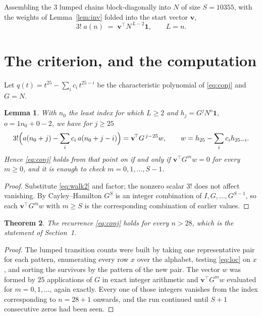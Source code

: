 \documentclass[11pt,a4paper]{article}
\theoremstyle{plain}
\newtheorem{theorem}{Theorem}
\newtheorem{lemma}[theorem]{Lemma}
\theoremstyle{definition}
\begin{document}
Assembling the $3$ lumped chains block-diagonally into $N$ of size $S=10355$, with the
weights of Lemma~\ref{lem:inv} folded into the start vector $\mathbf{v}$,
\begin{equation}\label{eq:walk2}
3!\;a(n)\;=\;\mathbf{v}^{\!\top}N^{\,L-2}\mathbf{1},\qquad L=n .
\end{equation}

\section{The criterion, and the computation}

Let $q(t)=t^{25}-\sum_i c_i\,t^{25-i}$ be the characteristic polynomial of
\eqref{eq:conj} and $G=N$.

\begin{lemma}\label{lem:crit}
With $n_0$ the least index for which $L\ge2$ and $h_j=G^{j}N^{o}\mathbf{1}$,
$o=1n_0+0-2$, we have for $j\ge25$
\[
3!\Bigl(a(n_0+j)-\sum_i c_i\,a(n_0+j-i)\Bigr)
=\mathbf{v}^{\!\top}G^{\,j-25}w,\qquad
w=h_{25}-\sum_i c_i h_{25-i} .
\]
Hence \eqref{eq:conj} holds from that point on if and only if
$\mathbf{v}^{\!\top}G^{m}w=0$ for every $m\ge0$, and it is enough to check
$m=0,1,\dots,S-1$.
\end{lemma}

\begin{proof}
Substitute \eqref{eq:walk2} and factor; the nonzero scalar $3!$ does not affect
vanishing. By Cayley--Hamilton $G^{S}$ is an integer combination of $I,G,\dots,G^{S-1}$,
so each $\mathbf{v}^{\!\top}G^{m}w$ with $m\ge S$ is the corresponding combination of
earlier values.
\end{proof}

\begin{theorem}
The recurrence \eqref{eq:conj} holds for every $n>28$, which is the statement of
Section~1.
\end{theorem}

\begin{proof}
The lumped transition counts were built by taking one representative pair for each pattern,
enumerating every row $x$ over the alphabet, testing \eqref{eq:loc} on $x$, and sorting
the survivors by the pattern of the new pair. The vector $w$ was formed by $25$
applications of $G$ in exact integer arithmetic and $\mathbf{v}^{\!\top}G^{m}w$
evaluated for $m=0,1,\dots$, again exactly. Every one of those integers vanishes from the
index corresponding to $n=28+1$ onwards, and the run continued until $S+1$ consecutive
zeros had been seen.
\end{proof}
\end{document}
